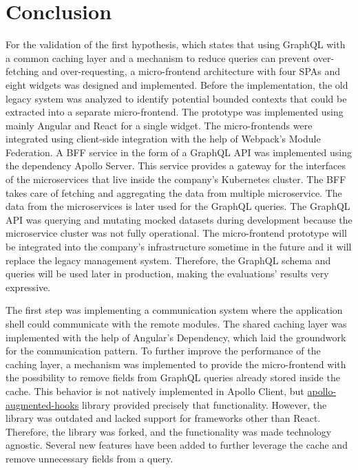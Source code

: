 \chapter{Conclusion}\label{chapter:conclusion}

\noindent For the validation of the first hypothesis, which states that using GraphQL with a common caching layer and a mechanism to reduce queries can prevent over-fetching and over-requesting, a micro-frontend architecture with four \acp{SPA} and eight widgets was designed and implemented. Before the implementation, the old legacy system was analyzed to identify potential bounded contexts that could be extracted into a separate micro-frontend. The prototype was implemented using mainly Angular and React for a single widget. The micro-frontends were integrated using client-side integration with the help of Webpack's Module Federation. A \ac{BFF} service in the form of a GraphQL \ac{API} was implemented using the dependency Apollo Server. This service provides a gateway for the interfaces of the microservices that live inside the company's Kubernetes cluster. The \ac{BFF} takes care of fetching and aggregating the data from multiple microservice. The data from the microservices is later used for the GraphQL queries. The GraphQL \ac{API} was querying and mutating mocked datasets during development because the microservice cluster was not fully operational. The micro-frontend prototype will be integrated into the company's infrastructure sometime in the future and it will replace the legacy management system. Therefore, the GraphQL schema and queries will be used later in production, making the evaluations' results very expressive.

\bigskip

\noindent The first step was implementing a communication system where the application shell could communicate with the remote modules. The shared caching layer was implemented with the help of Angular's Dependency, which laid the groundwork for the communication pattern. To further improve the performance of the caching layer, a mechanism was implemented to provide the micro-frontend with the possibility to remove fields from GraphQL queries already stored inside the cache. This behavior is not natively implemented in Apollo Client, but \href{https://github.com/appmotion/apollo-augmented-hooks}{apollo-augmented-hooks} library provided precisely that functionality. However, the library was outdated and lacked support for frameworks other than React. Therefore, the library was forked, and the functionality was made technology agnostic. Several new features have been added to further leverage the cache and remove unnecessary fields from a query.

